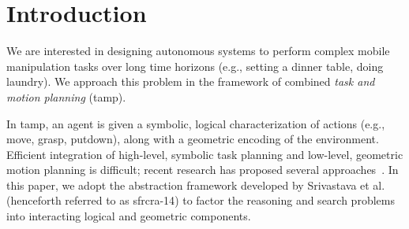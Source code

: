 \section{Introduction}
We are interested in designing autonomous systems to perform complex
mobile manipulation tasks over long time horizons (e.g., setting a
dinner table, doing laundry). We approach this problem in the
framework of combined \emph{task and motion planning} ({\sc tamp}).

In {\sc tamp}, an agent is given a symbolic, logical characterization
of actions (e.g., move, grasp, putdown), along with a geometric
encoding of the environment.  Efficient integration of high-level,
symbolic task planning and low-level, geometric motion planning is
difficult; recent research has proposed several
approaches~\cite{srivastava2014combined, deardenplanningtamp,
  kaelbling2011hierarchical, lagriffoul2014orientation,
  dornhege2012semantic, GarrettWAFR14}.  In this paper, we adopt the abstraction
framework developed by Srivastava et al.~\cite{srivastava2014combined}
(henceforth referred to as {\sc sfrcra-14}) to factor the reasoning
and search problems into interacting logical and geometric components.

